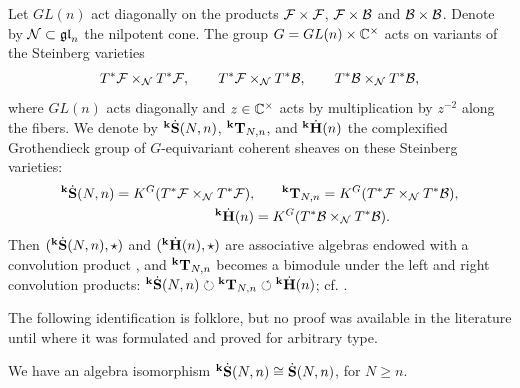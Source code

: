 Let $GL(n)$ act diagonally on the products $\mathcal{F}\times \mathcal{F}$, $\mathcal{F}\times \mathcal{B}$ and $\mathcal{B}\times \mathcal{B}$. Denote by $\mathcal{N} \subset \mathfrak{gl}_n$ the nilpotent cone. 
The group $G =GL(n)\times \mathbb{C}^\times$ acts on variants of the Steinberg varieties 
\begin{align*}
    T^*\mathcal{F} \times_{\mathcal{N}} T^*\mathcal{F}, \qquad 
    T^*\mathcal{F} \times_{\mathcal{N}} T^*\mathcal{B}, \qquad
    T^*\mathcal{B} \times_{\mathcal{N}} T^*\mathcal{B}, 
\end{align*}
where $GL(n)$ acts diagonally and $z\in \mathbb{C}^\times$ acts by multiplication by $z^{-2}$ along the fibers. We denote by ${}^{\bold{k}}\dot{\bold{S}}(N,n)$, ${}^{\bold{k}}\bold{T}_{N,n}$, and  ${}^{\bold{k}}\dot{\bold{H}}(n)$ the complexified Grothendieck group of $G$-equivariant coherent sheaves on 
these Steinberg varieties:
\begin{align}
    \label{KSchur}
\begin{split}
{}^{\bold{k}}\dot{\bold{S}}(N,n) =  K^G(T^*\mathcal{F} \times_{\mathcal{N}} T^*\mathcal{F}), 
 &  \qquad
{}^{\bold{k}}\bold{T}_{N,n} =K^G(T^*\mathcal{F} \times_{\mathcal{N}} T^*\mathcal{B}), 
\\
{}^{\bold{k}}\dot{\bold{H}}(n) &=K^G(T^*\mathcal{B} \times_{\mathcal{N}} T^*\mathcal{B}).
\end{split}
\end{align}
Then $({}^{\bold{k}}\dot{\bold{S}}(N,n), \star)$ and $({}^{\bold{k}}\dot{\bold{H}}(n), \star)$ are associative algebras endowed with a convolution product \cite{CG97, GV93}, and ${}^{\bold{k}}\bold{T}_{N,n}$ becomes a bimodule under the left and right convolution products:
${}^{\bold{k}}\dot{\bold{S}}(N,n) \circlearrowright {}^{\bold{k}}\bold{T}_{N,n} \circlearrowleft {}^{\bold{k}}\dot{\bold{H}}(n)$; cf. \cite{GRV94}. 

The following identification is folklore, but no proof was available in the literature until \cite[Theorem 5.21]{LXY26} where it was formulated and proved for arbitrary type. 

\begin{proposition} \cite{LXY26}
\label{prop:SameS}
  We have an algebra isomorphism ${}^{\bold{k}}\dot{\bold{S}}(N,n) \cong \dot{\bf S}(N,n)$, for $N\ge n$.
\end{proposition}
